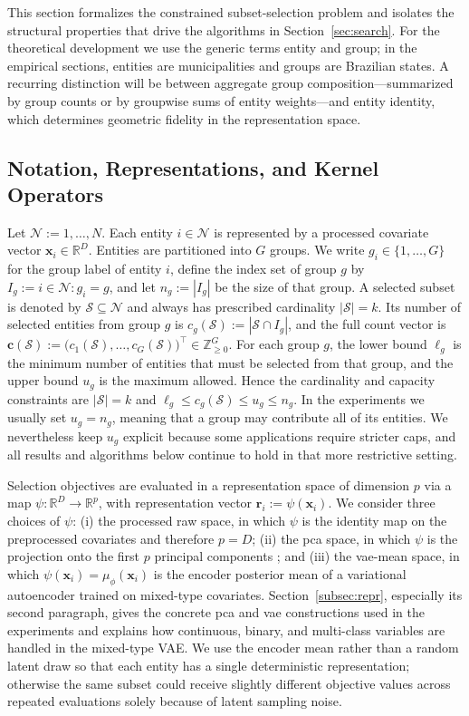 \documentclass[10pt,journal]{IEEEtran}
\newcommand{\R}{\mathbb{R}}
\newcommand{\1}{\mathbf{1}}
\newcommand{\bx}{\mathbf{x}}
\newcommand{\br}{\mathbf{r}}
\newcommand{\bc}{\mathbf{c}}
\newcommand{\Sel}{\mathcal{S}}
\theoremstyle{ieeethm}
\begin{document}
This section formalizes the constrained subset-selection problem and isolates the structural properties that drive the algorithms in Section~\ref{sec:search}. For the theoretical development we use the generic terms entity and group; in the empirical sections, entities are municipalities and groups are Brazilian states. A recurring distinction will be between aggregate group composition---summarized by group counts or by groupwise sums of entity weights---and entity identity, which determines geometric fidelity in the representation space.

\subsection{Notation, Representations, and Kernel Operators}
\label{subsec:notation}

Let $\mathcal{N}:={1,\dots,N}$. Each entity $i\in\mathcal{N}$ is represented by a processed covariate vector $\bx_i\in\R^D$. Entities are partitioned into $G$ groups. We write $g_i\in\{1,\dots,G\}$ for the group label of entity $i$, define the index set of group $g$ by $I_g:={i\in\mathcal{N}:g_i=g}$, and let $n_g:=|I_g|$ be the size of that group. A selected subset is denoted by $\Sel\subseteq\mathcal{N}$ and always has prescribed cardinality $|\Sel|=k$. Its number of selected entities from group $g$ is $c_g(\Sel):=|\Sel\cap I_g|$, and the full count vector is $\bc(\Sel):=\big(c_1(\Sel),\dots,c_G(\Sel)\big)^\top\in\mathbb{Z}_{\ge 0}^G$. For each group $g$, the lower bound $\ell_g$ is the minimum number of entities that must be selected from that group, and the upper bound $u_g$ is the maximum allowed. Hence the cardinality and capacity constraints are $|\Sel|=k$ and $\ell_g\le c_g(\Sel)\le u_g\le n_g$. In the experiments we usually set $u_g=n_g$, meaning that a group may contribute all of its entities. We nevertheless keep $u_g$ explicit because some applications require stricter caps, and all results and algorithms below continue to hold in that more restrictive setting.

Selection objectives are evaluated in a representation space of dimension $p$ via a map $\psi:\R^D\to\R^p$, with representation vector $\br_i:=\psi(\bx_i)$. We consider three choices of $\psi$: (i) the processed raw space, in which $\psi$ is the identity map on the preprocessed covariates and therefore $p=D$; (ii) the \gls{pca} space, in which $\psi$ is the projection onto the first $p$ principal components \cite{jolliffe2002principal}; and (iii) the \gls{vae}-mean space, in which $\psi(\bx_i)=\mu_\phi(\bx_i)$ is the encoder posterior mean of a variational autoencoder \cite{kingma2014autoencoding} trained on mixed-type covariates. Section~\ref{subsec:repr}, especially its second paragraph, gives the concrete \gls{pca} and \gls{vae} constructions used in the experiments and explains how continuous, binary, and multi-class variables are handled in the mixed-type VAE. We use the encoder mean rather than a random latent draw so that each entity has a single deterministic representation; otherwise the same subset could receive slightly different objective values across repeated evaluations solely because of latent sampling noise.
\end{document}
